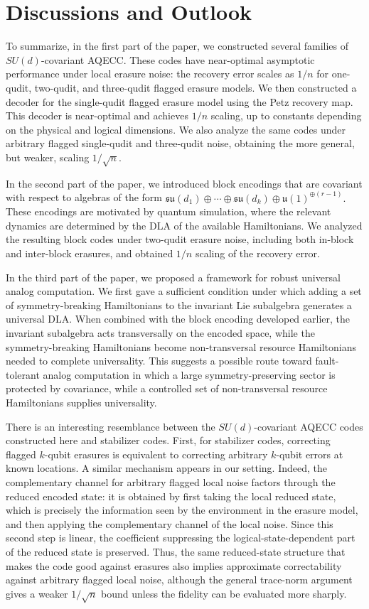 \documentclass[10pt,twocolumn,superscriptaddress,aps,amsmath,amssymb,citeautoscript,floatfix,prx,longbibliography]{revtex4-2}
\newcounter{alg}
\theoremstyle{plain}
\theoremstyle{plain}
\theoremstyle{plain}
\theoremstyle{plain}
\theoremstyle{plain}
\theoremstyle{plain}
\begin{document}
\section{Discussions and Outlook}\label{sec:main_disc}

To summarize, in the first part of the paper, we constructed several families of \(SU(d)\)-covariant AQECC. These codes have near-optimal asymptotic performance under local erasure noise: the recovery error scales
as \(1/n\) for one-qudit, two-qudit, and three-qudit flagged erasure models. We then constructed a decoder for the single-qudit flagged erasure model using the Petz recovery map. This decoder is near-optimal and achieves \(1/n\) scaling, up to constants depending on the physical and logical dimensions. We also analyze the same codes
under arbitrary flagged single-qudit and three-qudit noise, obtaining the more general, but weaker, scaling \(1/\sqrt n\).

In the second part of the paper, we introduced block encodings that are covariant with respect to algebras of the form
$
    \mathfrak{su}(d_1)\oplus\cdots\oplus\mathfrak{su}(d_k)
    \oplus
    \mathfrak{u}(1)^{\oplus(r-1)}.
$
These encodings are motivated by quantum simulation, where the relevant dynamics are determined by the DLA of the available
Hamiltonians. We analyzed the resulting block codes under two-qudit erasure noise, including both in-block and inter-block erasures, and obtained \(1/n\) scaling of the recovery error.

In the third part of the paper, we proposed a framework for robust universal analog computation. We first gave a sufficient condition under which adding a set of symmetry-breaking Hamiltonians to the invariant Lie subalgebra generates a universal DLA. When combined with the block encoding developed
earlier, the invariant subalgebra acts transversally on the encoded space, while the symmetry-breaking Hamiltonians become non-transversal resource Hamiltonians needed to complete universality. This suggests a possible route toward fault-tolerant analog computation in which a large symmetry-preserving sector is protected by covariance, while a controlled
set of non-transversal resource Hamiltonians supplies universality.

There is an interesting resemblance between the \(SU(d)\)-covariant AQECC codes constructed here and stabilizer codes. First, for stabilizer codes, correcting flagged \(k\)-qubit erasures is equivalent to correcting arbitrary \(k\)-qubit errors at known locations. A similar mechanism
appears in our setting. Indeed, the complementary channel for arbitrary flagged local noise factors through the reduced encoded state: it is obtained by first taking the local reduced state, which is precisely the information seen by the environment in the erasure model, and then applying the complementary channel of
the local noise. Since this second step is linear, the coefficient suppressing the logical-state-dependent part of the reduced state is preserved. Thus, the same reduced-state structure that makes the code good against erasures also implies approximate correctability against arbitrary flagged local noise, although the general trace-norm argument gives a weaker \(1/\sqrt n\) bound unless the
fidelity can be evaluated more sharply.
\end{document}
